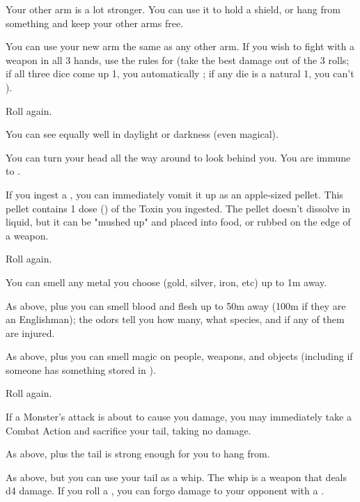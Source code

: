 \begin{multicols*}{2}
  Your other arm is a lot stronger.  You can use it to hold a shield, or hang from something and keep your other arms free.

  You can use your new arm the same as any other arm. If you wish to fight with a weapon in all 3 hands, use the rules for  (take the best damage out of the 3 rolls; if all three dice come up 1, you automatically ; if any die is a natural 1, you can't ).

  Roll again.

\NC[Name=Owl Head]

 You can see equally well in daylight or darkness (even magical). 

 You can turn your head all the way around to look behind you. You are immune to .

 If you ingest a , you can immediately vomit it up as an apple-sized pellet. This pellet contains 1 dose () of the Toxin you ingested. The pellet doesn't dissolve in liquid, but it can be "mushed up" and placed into food, or rubbed on the edge of a weapon.

 Roll again.


\NC[Name=Pig Snout]

 You can smell any metal you choose (gold, silver, iron, etc) up to 1m away.

 As above, plus you can smell blood and flesh up to 50m away (100m if they are an Englishman); the odors tell you how many, what species, and if any of them are injured.

 As above, plus you can smell magic on people, weapons, and objects (including if someone has something stored in ).

 Roll again.

\NC[Name=Rat Tail]

 If a Monster's attack is about to cause you  damage, you may immediately take a Combat Action and sacrifice your tail, taking no damage.

 As above, plus the tail is strong enough for you to hang from.

 As above, but you can use your tail as a whip.  The whip is a \DEX weapon that deals d4 damage.  If you roll a , you can forgo damage to  your opponent with a \RBTRY{\DEX}{\DEX}.


\end{multicols*}
